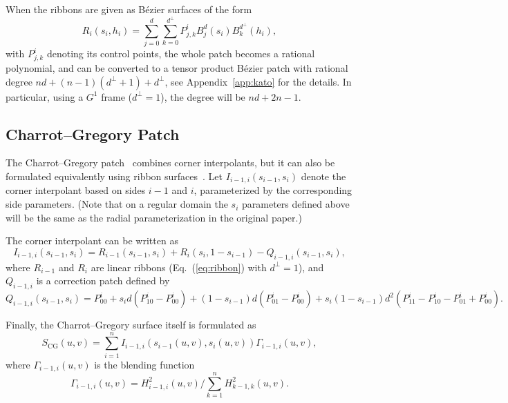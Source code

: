 \documentclass[9pt,academicons]{article}
\begin{document}
When the ribbons are given as B\'ezier surfaces of the form
\begin{equation}
  \label{eq:ribbon}
  R_i(s_i,h_i)=\sum_{j=0}^d\sum_{k=0}^{d^\perp}P_{j,k}^iB_j^d(s_i)B_k^{d^\perp}(h_i),
\end{equation}
with $P_{j,k}^i$ denoting its control points,
the whole patch becomes a rational polynomial, and can be converted to
a tensor product B\'ezier patch with rational degree $nd+(n-1)(d^\perp+1)+d^\perp$,
see Appendix~\ref{app:kato} for the details.
In particular, using a $G^1$ frame ($d^\perp=1$), the degree will be $nd+2n-1$.

\subsection{Charrot--Gregory Patch}
\label{subsec:charrot}
The Charrot--Gregory patch~\cite{Charrot:1984} combines corner interpolants, but it can
also be formulated equivalently using ribbon surfaces~\cite{Salvi:2014}.
Let $I_{i-1,i}(s_{i-1},s_i)$ denote the corner interpolant based on sides $i-1$ and $i$,
parameterized by the corresponding side parameters.
(Note that on a regular domain the $s_i$ parameters defined above
will be the same as the radial parameterization in the original paper.)

The corner interpolant can be written as
\begin{equation}
  I_{i-1,i}(s_{i-1},s_i)=R_{i-1}(s_{i-1},s_i)+R_i(s_i,1-s_{i-1})-Q_{i-1,i}(s_{i-1},s_i),
\end{equation}
where $R_{i-1}$ and $R_i$ are linear ribbons (Eq.~(\ref{eq:ribbon}) with $d^\perp=1$),
and $Q_{i-1,i}$ is a correction patch defined by
\begin{equation}
  Q_{i-1,i}(s_{i-1},s_i)=P_{00}^i+s_id(P_{10}^i-P_{00}^i)+(1-s_{i-1})d(P_{01}^i-P_{00}^i)
  +s_i(1-s_{i-1})d^2(P_{11}^i-P_{10}^i-P_{01}^i+P_{00}^i).
\end{equation}

Finally, the Charrot--Gregory surface itself is formulated as
\begin{equation}
  S_\mathrm{CG}(u,v)=\sum_{i=1}^n I_{i-1,i}(s_{i-1}(u,v),s_i(u,v))\Gamma_{i-1,i}(u,v),
\end{equation}
where $\Gamma_{i-1,i}(u,v)$ is the blending function
\begin{equation}
  \Gamma_{i-1,i}(u,v)=H_{i-1,i}^2(u,v)\big/\sum_{k=1}^nH_{k-1,k}^2(u,v).
\end{equation}
\end{document}
